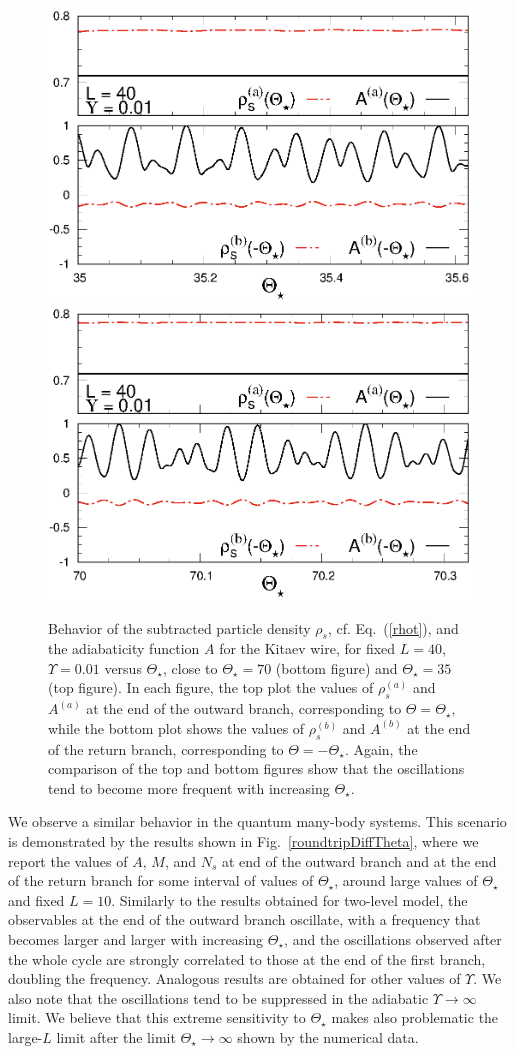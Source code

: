 \begin{figure}[!htb]
\centering
   \includegraphics[width=0.45\columnwidth]{imm/diffThstaru001T35l40.eps}
  \includegraphics[width=0.45\columnwidth]{imm/diffThstaru001T70l40.eps}
  \caption{ Behavior of the subtracted particle density $\rho_s$,
    cf. Eq.~(\ref{rhot}), and the adiabaticity function $A$ for the
    Kitaev wire, for fixed $L = 40$, $\Upsilon = 0.01$ versus
    $\Theta_\star$, close to $\Theta_\star = 70$ (bottom figure) and
    $\Theta_\star=35$ (top figure).  In each figure, the top plot the
    values of $\rho_s^{(a)}$ and $A^{(a)}$ at the end of the outward
    branch, corresponding to $\Theta=\Theta_\star$, while the bottom
    plot shows the values of $\rho_s^{(b)}$ and $A^{(b)}$ at the end
    of the return branch, corresponding to $\Theta=-\Theta_\star$.
    Again, the comparison of the top and bottom figures show that the
    oscillations tend to become more frequent with increasing
    $\Theta_\star$.  }
  \label{roundtripDiffThetaAR}
\end{figure}



We observe a similar behavior in the quantum many-body systems.  This
scenario is demonstrated by the results shown in
Fig.~\ref{roundtripDiffTheta}, where we report the values of $A$, $M$,
and $N_s$ at end of the outward branch and at the end of the return
branch for some interval of values of $\Theta_\star$, around large
values of $\Theta_\star$ and fixed $L=10$.  Similarly to the results
obtained for two-level model, the observables at the end of the
outward branch oscillate, with a frequency that becomes larger and
larger with increasing $\Theta_\star$, and the oscillations observed
after the whole cycle are strongly correlated to those at the end of
the first branch, doubling the frequency.  Analogous results are
obtained for other values of $\Upsilon$.  We also note that the
oscillations tend to be suppressed in the adiabatic
$\Upsilon\to\infty$ limit. We believe that this extreme sensitivity to
$\Theta_\star$ makes also problematic the large-$L$ limit after the
limit $\Theta_\star\to\infty$ shown by the numerical data.

